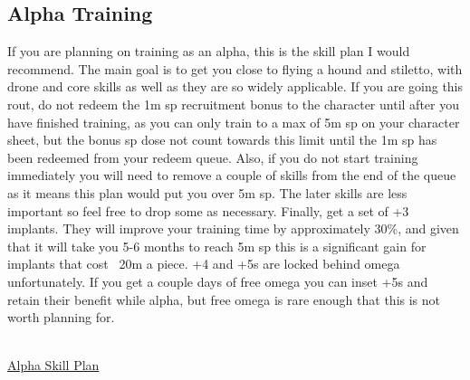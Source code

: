 \documentclass{article}
\begin{document}
\subsection{Alpha Training}
If you are planning on training as an alpha, this is the skill plan I would recommend. The main goal is to get you close to flying a hound and stiletto,
with drone and core skills as well as they are so widely applicable. If you are going this rout, do not redeem the 1m sp recruitment bonus to the 
character until after you have finished training, as you can only train to a max of 5m sp on your character sheet, but the bonus sp dose not count
towards this limit until the 1m sp has been redeemed from your redeem queue. Also, if you do not start training immediately you will need to remove
a couple of skills from the end of the queue as it means this plan would put you over 5m sp. The later skills are less important so feel free to drop 
some as necessary. Finally, get a set of +3 implants. They will improve your training time by approximately 30\%, and given that it will take you 5-6 months
to reach 5m sp this is a significant gain for implants that cost ~20m a piece. +4 and +5s are locked behind omega unfortunately. If you get a couple days
of free omega you can inset +5s and retain their benefit while alpha, but free omega is rare enough that this is not worth planning for.
\\
\\
\begin{center}
\hyperref[alphaSkillplan]{Alpha Skill Plan}
\end{center}


\clearpage
\end{document}
